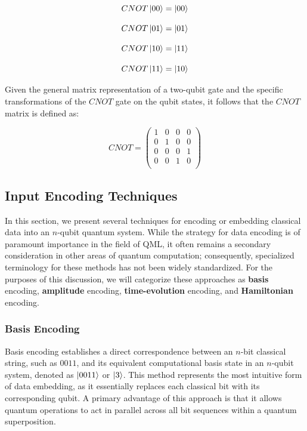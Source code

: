 \documentclass[en]{dimscthesis}
\begin{document}
\[
	CNOT\ket{00} = \ket{00} 
\]

\[
CNOT\ket{01} = \ket{01} 
\]

\[
CNOT\ket{10} = \ket{11} 
\]

\[
CNOT\ket{11} = \ket{10} 
\]

Given the general matrix representation of a two-qubit gate and the specific transformations of the $CNOT$ gate on the qubit states, it follows that the $CNOT$ matrix is defined as:

\begin{equation}
	CNOT = \begin{pmatrix}
		1 & 0 & 0 & 0 \\ 
		0 & 1 & 0 & 0 \\ 
		0 & 0 & 0 & 1 \\ 		
		0 & 0 & 1 & 0 \\ 
	\end{pmatrix} 
	\label{eq:cnot_matrix}
\end{equation}

\subsection{Input Encoding Techniques} \label{encoding}

In this section, we present several techniques for encoding or embedding classical data into an $n$-qubit quantum system. While the strategy for data encoding is of paramount importance in the field of QML, it often remains a secondary consideration in other areas of quantum computation; consequently, specialized terminology for these methods has not been widely standardized. For the purposes of this discussion, we will categorize these approaches as \textbf{basis} encoding, \textbf{amplitude} encoding, \textbf{time-evolution} encoding, and \textbf{Hamiltonian} encoding.

\subsubsection{Basis Encoding}

Basis encoding establishes a direct correspondence between an $n$-bit classical string, such as $0011$, and its equivalent computational basis state in an $n$-qubit system, denoted as $\ket{0011}$ or $\ket{3}$. This method represents the most intuitive form of data embedding, as it essentially replaces each classical bit with its corresponding qubit. A primary advantage of this approach is that it allows quantum operations to act in parallel across all bit sequences within a quantum superposition.
\end{document}
